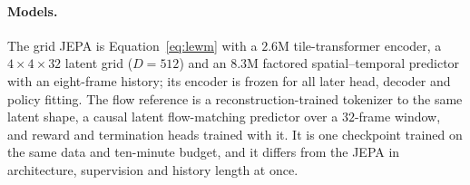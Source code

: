 \paragraph{Models.} The grid JEPA is Equation~\ref{eq:lewm} with a $2.6$M tile-transformer encoder, a
$4\times4\times32$ latent grid ($D=512$) and an $8.3$M factored spatial--temporal predictor with an eight-frame
history; its encoder is frozen for all later head, decoder and policy fitting. The flow reference
\citep{lipman2023flowmatching,chen2024diffusionforcing,hafner2025dreamer4} is a reconstruction-trained tokenizer to
the same latent shape, a causal latent flow-matching predictor over a $32$-frame window, and reward and
termination heads trained with it. It is one checkpoint trained on the same data and ten-minute budget, and it
differs from the JEPA in architecture, supervision and history length at once.
